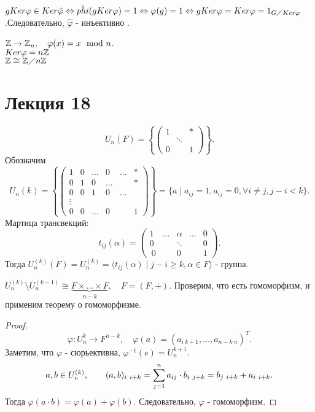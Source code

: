 \documentclass[12pt]{report}
\begin{document}
$g Ker \varphi  \in  Ker \hat{\varphi } \Leftrightarrow \hat{phi}(g Ker \varphi ) = 1 \Leftrightarrow \varphi (g) = 1 \Leftrightarrow g Ker \varphi  = Ker \varphi  = 1_{G \diagup Ker \varphi }$.Следовательно, $\hat{\varphi }$ - инъективно .
\begin{ex}
    $\mathbb{Z} \to \mathbb{Z}_n, \quad \varphi (x) = x \mod n$.\\
    $Ker \varphi  = n \mathbb{Z}$\\
    $\mathbb{Z} \cong \mathbb{Z} \diagup n\mathbb{Z}$
\end{ex}
\section{Лекция 18}
\begin{ex}
\[
    U_n(F)  = \left \{ 
	\left ( 
	\begin{array}{ccc}
	    1 &  & * \\
	      & \ddots & \\
	    0 & & 1
	\end{array}
	\right )
    \right \}
.\] 
Обозначим  \[
    U_n {(k)} = 
    \left \{
	\left ( 
	\begin{array}{cccccc}
	    1 & 0 & \ldots & 0 & \ldots & * \\
	    0 & 1 & 0 & \ldots & & * \\
	    0 & 0 & 1 & 0 &\ldots& \\
	    \vdots &&&&\\
	    0 & 0 & \ldots & 0 && 1
	\end{array}
	\right )
    \right \}
	=
	\{a \mid a_{ij} = 1, a_{ij} = 0, \forall i \ne j, j - i < k\}
.\] 
Мартица трансвекций:
\[
    t_{ij}(\alpha ) = 
    \left ( 
    \begin{array}{ccccc}
	1 & \ldots & \alpha & \ldots  & 0 \\
	0 && \ddots && 0\\\
	0 &&0&& 1
    \end{array}
    \right )
.\] 
Тогда $U^{(k)} _ n(F) = U _n^{(k)} = \langle t_{ij} (\alpha ) \mid j -i \ge  k, \alpha  \in  F \rangle$ - группа.
\begin{lm}
    $U_n^{(k)} \setminus U_n ^{(k-1)} \cong \underbrace {F \times \ldots \times F}_{n-k}, \quad F= (F, +)$. Проверим, что есть гомоморфизм, и применим теорему о гомоморфизме.
\end{lm}
\begin{proof}
\[
    \varphi : U_n ^k \to F^{n-k}, \quad \varphi (a) = (a_{i~ k+1}, \ldots , a_{n-k~ n})^T
.\] 
Заметим, что $\varphi$ - сюрьективна, $\varphi ^{-1} (e) = U^{k+1} _n$. 
\[
    a, b \in  U_n^{(k)} , \qquad (a, b) _{i~ i+k} = \sum\limits _{j=1} ^n a_{ij} \cdot b_{i~ j+k} = b_{j~ i+k} + a_{i~ i+k}
.\] 
Тогда $\varphi (a \cdot b) = \varphi(a) + \varphi(b) $. Следовательно, $\varphi $ - гомоморфизм.
\end{proof}
\end{ex}
\end{document}
